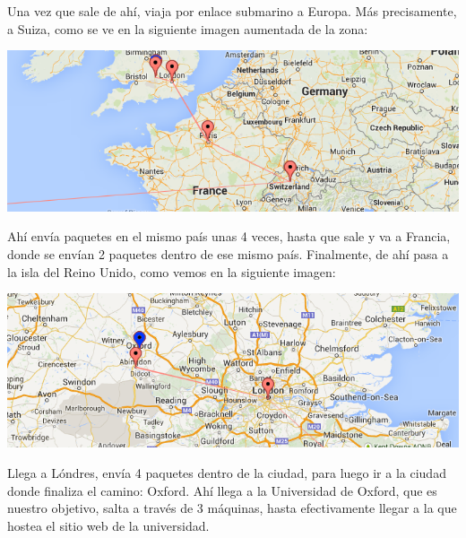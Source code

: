Una vez que sale de ahí, viaja por enlace submarino a Europa. Más precisamente, a Suiza, como se ve en la siguiente imagen aumentada de la zona:

\begin{center}
	\includegraphics[scale=0.6]{graphics/europe_zoom.png}
\end{center}

Ahí envía paquetes en el mismo país unas 4 veces, hasta que sale y va a Francia, donde se envían 2 paquetes dentro de ese mismo país. Finalmente, de ahí pasa a la isla del Reino Unido, como vemos en la siguiente imagen:

\begin{center}
	\includegraphics[scale=0.6]{graphics/united_kingdom_zoom.png}
\end{center}

Llega a Lóndres, envía 4 paquetes dentro de la ciudad, para luego ir a la ciudad donde finaliza el camino: Oxford. Ahí llega a la Universidad de Oxford, que es nuestro objetivo, salta a través de 3 máquinas, hasta efectivamente llegar a la que hostea el sitio web de la universidad.